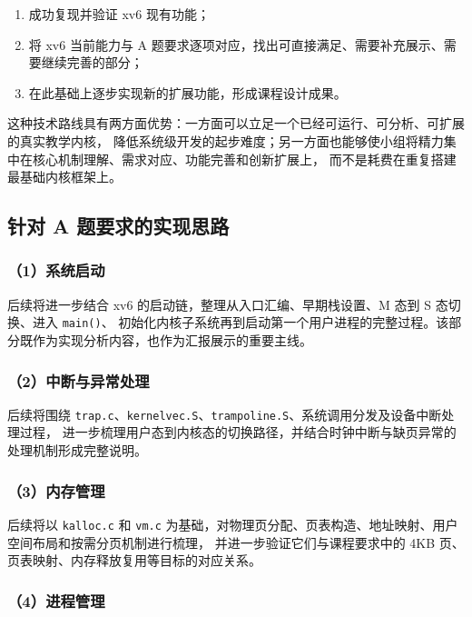 \documentclass[12pt,a4paper]{ctexart}
\begin{document}
\begin{enumerate}
  \item 成功复现并验证 xv6 现有功能；
  \item 将 xv6 当前能力与 A 题要求逐项对应，找出可直接满足、需要补充展示、需要继续完善的部分；
  \item 在此基础上逐步实现新的扩展功能，形成课程设计成果。
\end{enumerate}

这种技术路线具有两方面优势：一方面可以立足一个已经可运行、可分析、可扩展的真实教学内核，
降低系统级开发的起步难度；另一方面也能够使小组将精力集中在核心机制理解、需求对应、功能完善和创新扩展上，
而不是耗费在重复搭建最基础内核框架上。

\subsection{针对 A 题要求的实现思路}

\subsubsection*{（1）系统启动}

后续将进一步结合 xv6 的启动链，整理从入口汇编、早期栈设置、M 态到 S 态切换、进入 \texttt{main()}、
初始化内核子系统再到启动第一个用户进程的完整过程。该部分既作为实现分析内容，也作为汇报展示的重要主线。

\subsubsection*{（2）中断与异常处理}

后续将围绕 \texttt{trap.c}、\texttt{kernelvec.S}、\texttt{trampoline.S}、系统调用分发及设备中断处理过程，
进一步梳理用户态到内核态的切换路径，并结合时钟中断与缺页异常的处理机制形成完整说明。

\subsubsection*{（3）内存管理}

后续将以 \texttt{kalloc.c} 和 \texttt{vm.c} 为基础，对物理页分配、页表构造、地址映射、用户空间布局和按需分页机制进行梳理，
并进一步验证它们与课程要求中的 4KB 页、页表映射、内存释放复用等目标的对应关系。

\subsubsection*{（4）进程管理}
\end{document}
